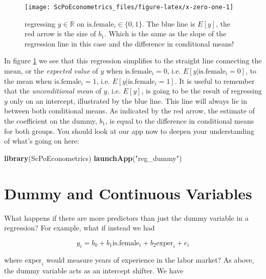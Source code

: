 \documentclass[]{book}
\newenvironment{Shaded}{\begin{snugshade}}{\end{snugshade}}
\newcommand{\KeywordTok}[1]{\textcolor[rgb]{0.13,0.29,0.53}{\textbf{#1}}}
\newcommand{\StringTok}[1]{\textcolor[rgb]{0.31,0.60,0.02}{#1}}
\newcommand{\NormalTok}[1]{#1}
\begin{document}
\begin{figure}

{\centering \texttt{[image: ScPoEconometrics\_files/figure-latex/x-zero-one-1]} 

}

\caption{regressing $y \in \mathbb{R}$ on $\text{is.female}_i \in \{0,1\}$. The blue line is $E[y]$, the red arrow is the size of $b_1$. Which is the same as the slope of the regression line in this case and the difference in conditional means!}\label{fig:x-zero-one}
\end{figure}

In figure \ref{fig:x-zero-one} we see that this regression simplifies to
the straight line connecting the mean, or the \emph{expected value} of
\(y\) when \(\text{is.female}_i = 0\), i.e.
\(E[y|\text{is.female}_i=0]\), to the mean when
\(\text{is.female}_i=1\), i.e. \(E[y|\text{is.female}_i=1]\). It is
useful to remember that the \emph{unconditional mean} of \(y\), i.e.
\(E[y]\), is going to be the result of regressing \(y\) only on an
intercept, illustrated by the blue line. This line will always lie in
between both conditional means. As indicated by the red arrow, the
estimate of the coefficient on the dummy, \(b_1\), is equal to the
difference in conditional means for both groups. You should look at our
app now to deepen your understanding of what's going on here:

\begin{Shaded}
\begin{Highlighting}[]
\KeywordTok{library}\NormalTok{(ScPoEconometrics)}
\KeywordTok{launchApp}\NormalTok{(}\StringTok{"reg_dummy"}\NormalTok{)}
\end{Highlighting}
\end{Shaded}

\section{Dummy and Continuous
Variables}\label{dummy-and-continuous-variables}

What happens if there are more predictors than just the dummy variable
in a regression? For example, what if instead we had

\begin{equation}
y_i = b_0 + b_1 \text{is.female}_i + b_2 \text{exper}_i + e_i \label{eq:dummy-reg2}
\end{equation}

where \(\text{exper}_i\) would measure years of experience in the labor
market? As above, the dummy variable acts as an intercept shifter. We
have
\end{document}
